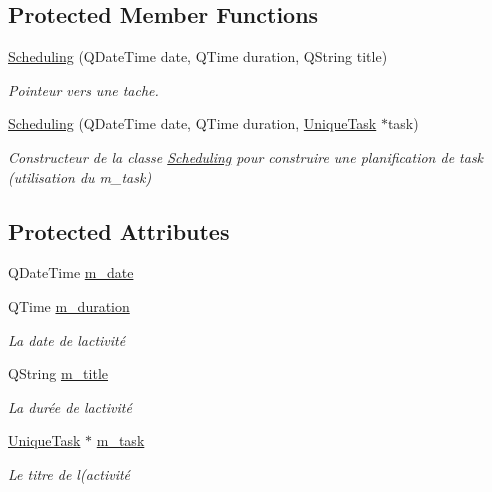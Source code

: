 \subsection*{Protected Member Functions}
\begin{DoxyCompactItemize}
\item 
\hyperlink{class_scheduling_a52ca2e0ddd2dc1bf6eb140f9994bd323}{Scheduling} (Q\+Date\+Time date, Q\+Time duration, Q\+String title)
\begin{DoxyCompactList}\small\item\em Pointeur vers une tache. \end{DoxyCompactList}\item 
\hyperlink{class_scheduling_a4d07fce3e6ac5e326b28f0f354a32bcb}{Scheduling} (Q\+Date\+Time date, Q\+Time duration, \hyperlink{class_unique_task}{Unique\+Task} $\ast$task)
\begin{DoxyCompactList}\small\item\em Constructeur de la classe \hyperlink{class_scheduling}{Scheduling} pour construire une planification de task (utilisation du m\+\_\+task) \end{DoxyCompactList}\end{DoxyCompactItemize}
\subsection*{Protected Attributes}
\begin{DoxyCompactItemize}
\item 
Q\+Date\+Time \hyperlink{class_scheduling_a1f0fd5013f53a2e21c8e8fe372bdd995}{m\+\_\+date}
\item 
Q\+Time \hyperlink{class_scheduling_a4f68ae25783c736a6056d944bcd9c6c9}{m\+\_\+duration}
\begin{DoxyCompactList}\small\item\em La date de l\textquotesingle{}activité \end{DoxyCompactList}\item 
Q\+String \hyperlink{class_scheduling_a5c62b4b778b6285407cad0ad9c593cf7}{m\+\_\+title}
\begin{DoxyCompactList}\small\item\em La durée de l\textquotesingle{}activité \end{DoxyCompactList}\item 
\hyperlink{class_unique_task}{Unique\+Task} $\ast$ \hyperlink{class_scheduling_a0047ba609aef28fb9c07db1245e14a56}{m\+\_\+task}
\begin{DoxyCompactList}\small\item\em Le titre de l(\textquotesingle{}activité \end{DoxyCompactList}\end{DoxyCompactItemize}
